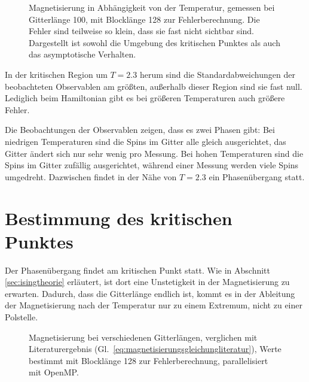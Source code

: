 

	
	\begin{figure}[htbp]
		
		\caption[Magnetisierung in Abhängigkeit von der Temperatur]{Magnetisierung in Abhängigkeit von der Temperatur, gemessen bei Gitterlänge 100, mit Blocklänge 128 zur Fehlerberechnung. Die Fehler sind teilweise so klein, dass sie fast nicht sichtbar sind. Dargestellt ist sowohl die Umgebung des kritischen Punktes als auch das asymptotische Verhalten.}
		\label{fig:ergebnismagnetisierung}
	\end{figure}
	
	In der kritischen Region um $T=\num{2,3}$ herum sind die Standardabweichungen der beobachteten Observablen am größten, außerhalb dieser Region sind sie fast null. Lediglich beim Hamiltonian gibt es bei größeren Temperaturen auch größere Fehler. 
	
	Die Beobachtungen der Observablen zeigen, dass es zwei Phasen gibt: Bei niedrigen Temperaturen sind die Spins im Gitter alle gleich ausgerichtet, das Gitter ändert sich nur sehr wenig pro Messung. Bei hohen Temperaturen sind die Spins im Gitter zufällig ausgerichtet, während einer Messung werden viele Spins umgedreht. Dazwischen findet in der Nähe von $T=\num{2,3}$ ein Phasenübergang statt.
	
	\section{Bestimmung des kritischen Punktes}
	\label{sec:bestkritpunkt}
	
	Der Phasenübergang findet am kritischen Punkt statt. Wie in Abschnitt \ref{sec:isingtheorie} erläutert, ist dort eine Unstetigkeit in der Magnetisierung zu erwarten. Dadurch, dass die Gitterlänge endlich ist, kommt es in der Ableitung der Magnetisierung nach der Temperatur nur zu einem Extremum, nicht zu einer Polstelle. %
		
	\begin{figure}[htbp]
		
		\caption[Magnetisierung bei verschiedenen Gitterlängen und Verwendung von OpenMP]{Magnetisierung bei verschiedenen Gitterlängen, verglichen mit Literaturergebnis (Gl.~\ref{eq:magnetisierungsgleichungliteratur}), Werte bestimmt mit Blocklänge 128 zur Fehlerberechnung, parallelisiert mit OpenMP.}
		\label{fig:maglaenge}
	\end{figure}

